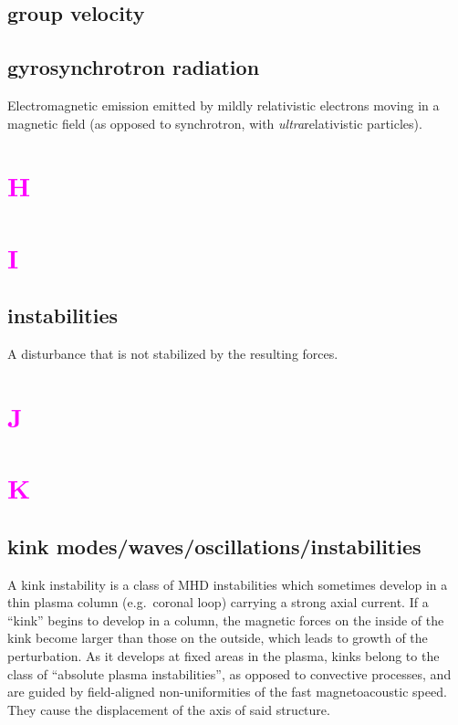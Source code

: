 \documentclass[12pt]{article}
\begin{document}
\subsection*{group velocity}

\subsection*{gyrosynchrotron radiation}
Electromagnetic emission emitted by mildly relativistic electrons moving
in a magnetic field
(as opposed to synchrotron, with \emph{ultra}relativistic particles).

\section*{\textcolor{magenta}{H}}

\section*{\textcolor{magenta}{I}}
\subsection*{instabilities}
A disturbance that is not stabilized by the resulting forces.

\section*{\textcolor{magenta}{J}}
\section*{\textcolor{magenta}{K}}

\subsection*{kink modes/waves/oscillations/instabilities}
A kink instability is a class of MHD instabilities which sometimes develop
in a thin plasma column (e.g.\ coronal loop) carrying a strong axial current.
If a ``kink'' begins to develop in a column, the magnetic forces
on the inside of the kink become larger than those on the outside,
which leads to growth of the perturbation. As it develops at fixed
areas in the plasma, kinks belong to the class of ``absolute plasma
instabilities'', as opposed to convective processes, and are guided by
field-aligned non-uniformities of the fast magnetoacoustic speed.
They cause the displacement of the axis of said
structure.
\end{document}
